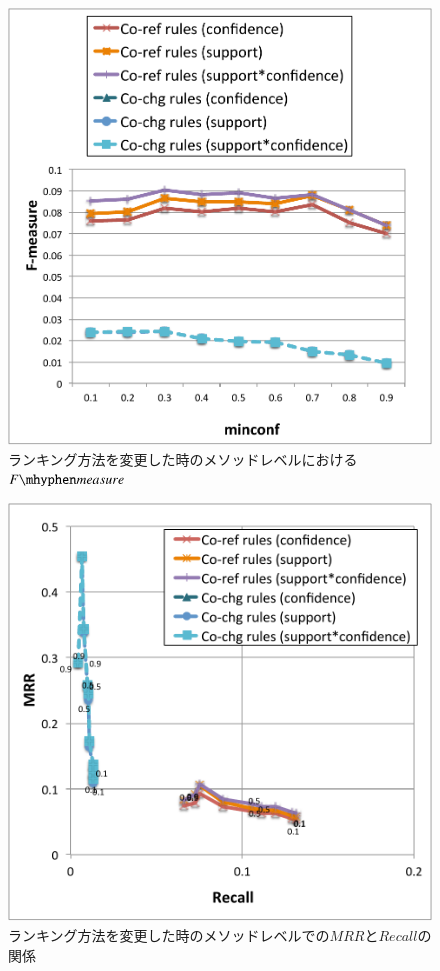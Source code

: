 \documentclass[a4paper]{jsbook}
\newcommand{\fmeasure}{F\mhyphen measure}
\begin{document}
\begin{figure}[p]
  \centering
  \includegraphics[width = 0.95\linewidth]{resource/fmeasure_rank_m.pdf}
  \caption{ランキング方法を変更した時のメソッドレベルにおける$\fmeasure$}
  \label{m_fmeasure_rank}
\end{figure}
\begin{figure}[p]
  \centering
  \includegraphics[width = 0.95\linewidth]{resource/mrgraph_rank_m.pdf}
  \caption{ランキング方法を変更した時のメソッドレベルでの$MRR$と$Recall$の関係}
  \label{m_mrgraph_rank}
\end{figure}
\end{document}
